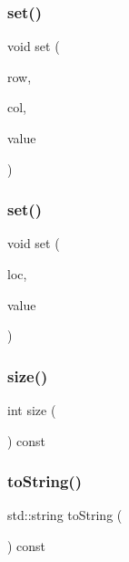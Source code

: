 \mbox{\label{classGrid_a6f5cee26d171f36d280a15c51332efc2}} 
\subsubsection{\texorpdfstring{set()}{set()}\hspace{0.1cm}{\footnotesize\ttfamily [1/2]}}
{\footnotesize\ttfamily void set (\begin{DoxyParamCaption}\item[{int}]{row,  }\item[{int}]{col,  }\item[{const Value\+Type \&}]{value }\end{DoxyParamCaption})}

\mbox{\label{classGrid_a02a61287a9aee6a1ff7e8a8325ce094d}} 
\subsubsection{\texorpdfstring{set()}{set()}\hspace{0.1cm}{\footnotesize\ttfamily [2/2]}}
{\footnotesize\ttfamily void set (\begin{DoxyParamCaption}\item[{const \mbox{\hyperlink{structGridLocation}{Grid\+Location}} \&}]{loc,  }\item[{const Value\+Type \&}]{value }\end{DoxyParamCaption})}

\mbox{\label{classGrid_af9593d4a5ff4274efaf429cb4f9e57cc}} 
\subsubsection{\texorpdfstring{size()}{size()}}
{\footnotesize\ttfamily int size (\begin{DoxyParamCaption}{ }\end{DoxyParamCaption}) const}

\mbox{\label{classGrid_a1fe5121d6528fdea3f243321b3fa3a49}} 
\subsubsection{\texorpdfstring{to\+String()}{toString()}}
{\footnotesize\ttfamily std\+::string to\+String (\begin{DoxyParamCaption}{ }\end{DoxyParamCaption}) const}


